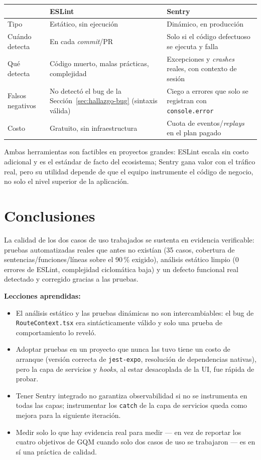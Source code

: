 \documentclass[11pt,a4paper]{article}
\begin{document}
\begin{longtable}{p{3cm} p{5.7cm} p{5.7cm}}
\toprule
 & \textbf{ESLint} & \textbf{Sentry} \\
\midrule
\endhead
Tipo & Estático, sin ejecución & Dinámico, en producción \\
Cuándo detecta & En cada \textit{commit}/PR & Solo si el código defectuoso se ejecuta y falla \\
Qué detecta & Código muerto, malas prácticas, complejidad & Excepciones y \textit{crashes} reales, con contexto de sesión \\
Falsos negativos & No detectó el bug de la Sección~\ref{sec:hallazgo-bug} (sintaxis válida) & Ciego a errores que solo se registran con \texttt{console.error} \\
Costo & Gratuito, sin infraestructura & Cuota de eventos/\textit{replays} en el plan pagado \\
\bottomrule
\end{longtable}

Ambas herramientas son factibles en proyectos grandes: ESLint escala sin costo adicional y
es el estándar de facto del ecosistema; Sentry gana valor con el tráfico real, pero su
utilidad depende de que el equipo instrumente el código de negocio, no solo el nivel
superior de la aplicación.

\section{Conclusiones}

La calidad de los dos casos de uso trabajados se sustenta en evidencia verificable: pruebas
automatizadas reales que antes no existían (35 casos, cobertura de sentencias/funciones/líneas
sobre el 90\,\% exigido), análisis estático limpio (0 errores de ESLint, complejidad
ciclomática baja) y un defecto funcional real detectado y corregido gracias a las pruebas.

\textbf{Lecciones aprendidas:}

\begin{itemize}[leftmargin=1.3cm]
  \item El análisis estático y las pruebas dinámicas no son intercambiables: el bug de
  \texttt{RouteContext.tsx} era sintácticamente válido y solo una prueba de comportamiento
  lo reveló.
  \item Adoptar pruebas en un proyecto que nunca las tuvo tiene un costo de arranque
  (versión correcta de \texttt{jest-expo}, resolución de dependencias nativas), pero la capa
  de servicios y \textit{hooks}, al estar desacoplada de la UI, fue rápida de probar.
  \item Tener Sentry integrado no garantiza observabilidad si no se instrumenta en todas las
  capas; instrumentar los \texttt{catch} de la capa de servicios queda como mejora para la
  siguiente iteración.
  \item Medir solo lo que hay evidencia real para medir --- en vez de reportar los cuatro
  objetivos de GQM cuando solo dos casos de uso se trabajaron --- es en sí una práctica de
  calidad.
\end{itemize}
\end{document}

